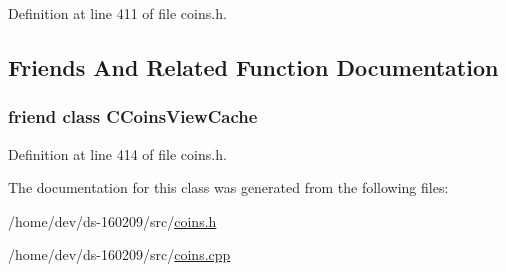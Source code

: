 Definition at line 411 of file coins.\+h.



\subsection{Friends And Related Function Documentation}
\hypertarget{class_c_coins_modifier_a1a8530a17e2e3f56e97217784400ee46}{}
\subsubsection[{C\+Coins\+View\+Cache}]{\setlength{\rightskip}{0pt plus 5cm}friend class {\bf C\+Coins\+View\+Cache}\hspace{0.3cm}{\ttfamily [friend]}}\label{class_c_coins_modifier_a1a8530a17e2e3f56e97217784400ee46}


Definition at line 414 of file coins.\+h.



The documentation for this class was generated from the following files\+:\begin{DoxyCompactItemize}
\item 
/home/dev/ds-\/160209/src/\hyperlink{coins_8h}{coins.\+h}\item 
/home/dev/ds-\/160209/src/\hyperlink{coins_8cpp}{coins.\+cpp}\end{DoxyCompactItemize}
